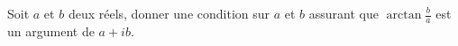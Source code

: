 Soit $a$ et $b$ deux r\'eels, donner une condition sur $a$ et $b$ assurant que $\arctan \frac{b}{a}$ est un argument de $a+ib$. \bigskip